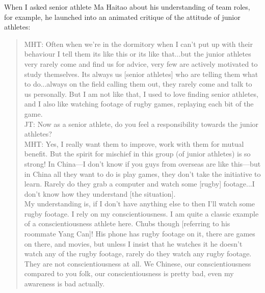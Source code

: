\begin{CJK}{UTF8}{gbsn}




When I asked senior athlete Ma Haitao about his understanding of team roles, for example, he launched into an animated critique of the attitude of junior athletes:

  \begin{quote}
    MHT: Often when we're in the dormitory when I can't put up with their behaviour I tell them its like this or its like that...but the junior athletes very rarely come and find us for advice, very few are actively motivated to study themselves. Its always us [senior athletes] who are telling them what to do...always on the field calling them out, they rarely come and talk to us personally.  But I am not like that, I used to love finding senior athletes, and I also like watching footage of rugby games, replaying each bit of the game.\\

    JT: Now as a senior athlete, do you feel a responsibility towards the junior athletes?\\

    MHT: Yes, I really want them to improve, work with them for mutual benefit.  But the spirit for mischief in this group (of junior athletes) is so strong! In China---I don't know if you guys from overseas are like this---but in China all they want to do is play games, they don't take the initiative to learn.  Rarely do they grab a computer and watch some [rugby] footage...I don’t know how they understand [the situation].
\\
    My understanding is, if I don’t have anything else to then I’ll watch some rugby footage. I rely on my conscientiousness.  I am quite a classic example of a conscientiousness athlete here.  Chubs though [referring to his roommate Yang Can]!  His phone has rugby footage on it, there are games on there, and movies, but unless I insist that he watches it he doesn't watch any of the rugby footage, rarely do they watch any rugby footage.  They are not conscientiousness at all. We Chinese, our conscientiousness compared to you folk, our conscientiousness is pretty bad, even my awareness is bad actually.
  \end{quote}


\end{CJK}
